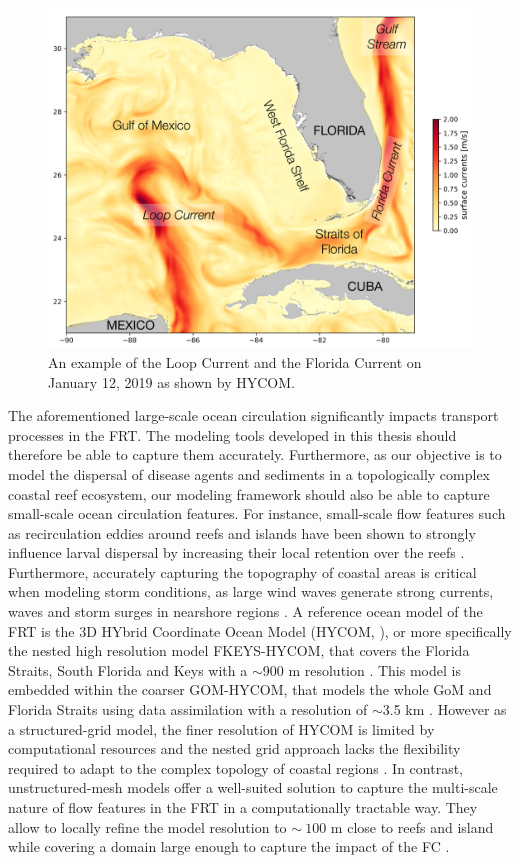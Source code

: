\begin{figure}
	\centering
	\includegraphics[width=.9\textwidth]{chapters/intro/figures/fig_gom.png}
	\caption{An example of the Loop Current and the Florida Current on January 12, 2019 as shown by HYCOM.}
	\label{intro:gom}
\end{figure}

The aforementioned large-scale ocean circulation significantly impacts transport processes in the FRT. The modeling tools developed in this thesis should therefore be able to capture them accurately. Furthermore, as our objective is to model the dispersal of disease agents and sediments in a topologically complex coastal reef ecosystem, our modeling framework should also be able to capture small-scale ocean circulation features. For instance, small-scale flow features such as recirculation eddies around reefs and islands have been shown to strongly influence larval dispersal by increasing their local retention over the reefs \citep{figueiredo2013synthesizing}. Furthermore, accurately capturing the topography of coastal areas is critical when modeling storm conditions, as large wind waves generate strong currents, waves and storm surges in nearshore regions \citep{dietrich2010high, weisberg2006hurricane}. A reference ocean model of the FRT is the 3D HYbrid Coordinate Ocean Model (HYCOM, \citealp{chassignet2007hycom}), or more specifically the nested high resolution model FKEYS-HYCOM, that covers the Florida Straits, South Florida and Keys with a $\sim$900 m resolution \citep{kourafalou2012florida}. This model is embedded within the coarser GOM-HYCOM, that models the whole GoM and Florida Straits using data assimilation with a resolution of $\sim$3.5 km \citep{cummings2005operational,prasad2007upper}. However as a structured-grid model, the finer resolution of HYCOM is limited by computational resources and the nested grid approach lacks the flexibility required to adapt to the complex topology of coastal regions \citep{fringer2019future}. In contrast, unstructured-mesh models offer a well-suited solution to capture the multi-scale nature of flow features in the FRT in a computationally tractable way. They allow to locally refine the model resolution to $\sim~100$ m close to reefs and island while covering a domain large enough to capture the impact of the FC \citep{lambrechts2008multi,frys2020fine}.

